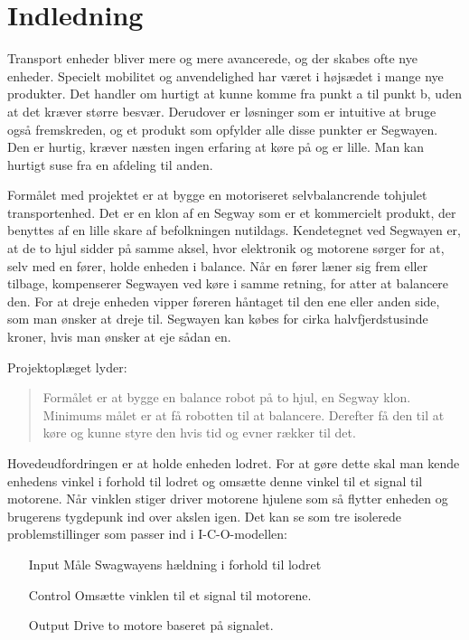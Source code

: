 \documentclass[a4paper,oneside,article,danish,table]{memoir}
\begin{document}
\chapter{Indledning}\label{chap:ind} 
Transport enheder bliver mere og mere avancerede, og der skabes ofte nye enheder. Specielt mobilitet og anvendelighed har været i højsædet i mange nye produkter. Det handler om hurtigt at kunne komme fra punkt a til punkt b, uden at det kræver større besvær. Derudover er løsninger som er intuitive at bruge også fremskreden, og et produkt som opfylder alle disse punkter er Segwayen. Den er hurtig, kræver næsten ingen erfaring at køre på og er lille. Man kan hurtigt suse fra en afdeling til anden. 

Formålet med projektet er at bygge en motoriseret selvbalancrende tohjulet transportenhed. Det er en klon af en Segway som er et kommercielt produkt, der benyttes af en lille skare af befolkningen nutildags. Kendetegnet ved Segwayen er, at de to hjul sidder på samme aksel, hvor elektronik og motorene sørger for at, selv med en fører, holde enheden i balance. Når en fører læner sig frem eller tilbage, kompenserer Segwayen ved køre i samme retning, for atter at balancere den. For at dreje enheden vipper føreren håntaget til den ene eller anden side, som man ønsker at dreje til. Segwayen kan købes for cirka halvfjerdstusinde kroner, hvis man ønsker at eje sådan en.

Projektoplæget lyder:
\begin{quote}
  Formålet er at bygge en balance robot på to hjul, en Segway klon. Minimums målet er at få robotten til at balancere. Derefter få den til at køre og kunne styre den hvis tid og evner rækker til det.
\end{quote}

Hovedeudfordringen er at holde enheden lodret. For at gøre dette skal man kende enhedens vinkel i forhold til lodret og omsætte denne vinkel til et signal til motorene. Når vinklen stiger driver motorene hjulene som så flytter enheden og brugerens tygdepunk ind over akslen igen.
Det kan se som tre isolerede problemstillinger som passer ind i I-C-O-modellen:
\begin{itemize}
\item[Input] Måle Swagwayens hældning i forhold til lodret
\item[Control] Omsætte vinklen til et signal til motorene.
\item[Output] Drive to motore baseret på signalet.
\end{itemize}
\end{document}
